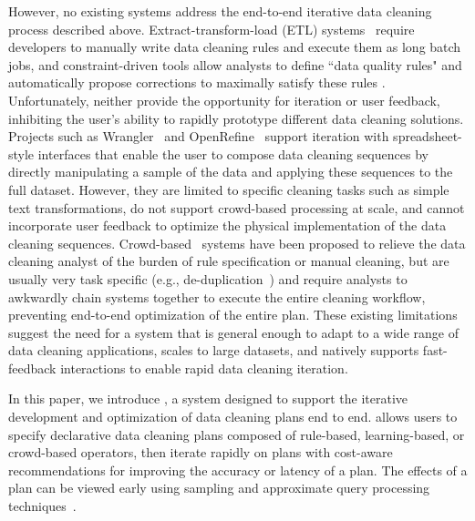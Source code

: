 However, no existing systems address the end-to-end iterative data cleaning process described above.
Extract-transform-load (ETL) systems~\cite{informatica,talend,apachefalcon} require developers to manually write data cleaning rules and execute them as long batch jobs, 
and constraint-driven tools allow analysts to define ``data quality rules" and automatically propose corrections to maximally satisfy these rules \cite{DBLP:conf/sigmod/DallachiesaEEEIOT13}.
Unfortunately, neither provide the opportunity for iteration or user feedback, inhibiting the user's ability to rapidly prototype different data cleaning solutions.
Projects such as Wrangler~\cite{wrangler,trifacta} and OpenRefine~\cite{openrefine} support iteration with spreadsheet-style interfaces that enable the user to compose data cleaning sequences by directly manipulating a sample of the data and applying these sequences to the full dataset.
However, they are limited to specific cleaning tasks such as simple text transformations, do not support crowd-based processing at scale, and cannot incorporate user feedback to optimize the physical implementation of the data cleaning sequences.
Crowd-based~\cite{gokhale2014corleone,stonebraker2013data} systems have been proposed to relieve the data cleaning analyst of the burden of rule specification or manual cleaning, but are usually very task specific (e.g., de-duplication~\cite{gokhale2014corleone,park2014crowdfill,eracer,chen2014integrating}) and require analysts to awkwardly chain systems together to execute the entire cleaning workflow, preventing end-to-end optimization of the entire plan.
These existing limitations suggest the need for a system that is general enough to adapt to a wide range of data cleaning applications, scales to large datasets, and natively supports fast-feedback interactions to enable rapid data cleaning iteration.

In this paper, we introduce \sys, a system designed to support the iterative development and optimization of data cleaning plans end to end.
\sys allows users to specify declarative data cleaning plans composed of rule-based, learning-based, or crowd-based operators, then iterate rapidly on plans with cost-aware recommendations for improving the accuracy or latency of a plan.
The effects of a plan can be viewed early using sampling and approximate query processing techniques~\cite{wang1999sample}.

